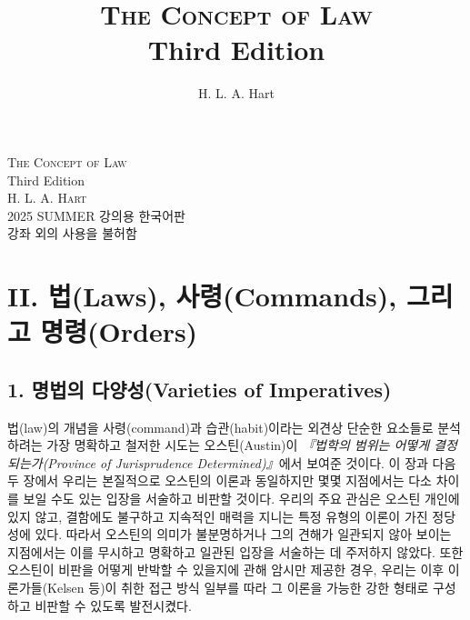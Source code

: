 \documentclass[12pt, oneside]{book}  %
\title{\Huge\textsc{The Concept of Law} \\[2ex] \Large Third Edition}
\author{\Large H. L. A. Hart}
\date{}
\begin{document}
\begin{titlepage}
  \centering
  \vspace*{3cm}
  {\Huge\textsc{The Concept of Law}}\\[1.5ex]
  {\Large Third Edition}\\[4ex]
  \textsc{H. L. A. Hart}\\[6ex]
  {\small 2025 SUMMER 강의용 한국어판\\
  강좌 외의 사용을 불허함}
  \vfill
\end{titlepage}

\section{\texorpdfstring{\textbf{II. 법(Laws), 사령(Commands), 그리고
명령(Orders)}}{II. 법(Laws), 사령(Commands), 그리고 명령(Orders)}}\label{ii.-uxbc95laws-uxc0acuxb839commands-uxadf8uxb9acuxace0-uxba85uxb839orders}

\subsection{\texorpdfstring{\textbf{1. 명법의 다양성(Varieties of
Imperatives)}}{1. 명법의 다양성(Varieties of Imperatives)}}\label{uxba85uxbc95uxc758-uxb2e4uxc591uxc131varieties-of-imperatives}

법(law)의 개념을 사령(command)과 습관(habit)이라는 외견상 단순한
요소들로 분석하려는 가장 명확하고 철저한 시도는 오스틴(Austin)이
\emph{『법학의 범위는 어떻게 결정되는가(Province of Jurisprudence
Determined)』}에서 보여준 것이다. 이 장과 다음 두 장에서 우리는
본질적으로 오스틴의 이론과 동일하지만 몇몇 지점에서는 다소 차이를 보일
수도 있는 입장을 서술하고 비판할 것이다. 우리의 주요 관심은 오스틴
개인에 있지 않고, 결함에도 불구하고 지속적인 매력을 지니는 특정 유형의
이론이 가진 정당성에 있다. 따라서 오스틴의 의미가 불분명하거나 그의
견해가 일관되지 않아 보이는 지점에서는 이를 무시하고 명확하고 일관된
입장을 서술하는 데 주저하지 않았다. 또한 오스틴이 비판을 어떻게 반박할
수 있을지에 관해 암시만 제공한 경우, 우리는 이후 이론가들(Kelsen 등)이
취한 접근 방식 일부를 따라 그 이론을 가능한 강한 형태로 구성하고 비판할
수 있도록 발전시켰다.
\end{document}
